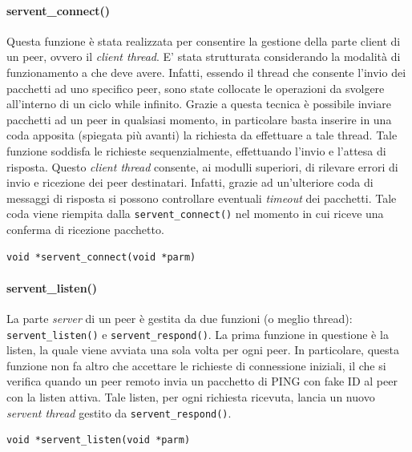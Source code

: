 \paragraph{servent\_connect()}
Questa funzione è stata realizzata per consentire la gestione della parte client di un peer, ovvero il \textit{client thread}. E' stata strutturata considerando la modalità di funzionamento a che deve avere. Infatti, essendo il thread che consente l'invio dei pacchetti ad uno specifico peer, sono state collocate le operazioni da svolgere all'interno di un ciclo while infinito. Grazie a questa tecnica è possibile inviare pacchetti ad un peer in qualsiasi momento, in particolare basta inserire in una coda apposita (spiegata più avanti) la richiesta da effettuare a tale thread. Tale funzione soddisfa le richieste sequenzialmente, effettuando l'invio e l'attesa di risposta.
Questo \textit{client thread} consente, ai modulli superiori, di rilevare errori di invio e ricezione dei peer destinatari. Infatti, grazie ad un'ulteriore coda di messaggi di risposta si possono controllare eventuali \textit{timeout} dei pacchetti. Tale coda viene riempita dalla \texttt{servent\_connect()} nel momento in cui riceve una conferma di ricezione pacchetto.
\begin{lstlisting}
void *servent_connect(void *parm)
\end{lstlisting}

\paragraph{servent\_listen()}
La parte \textit{server} di un peer è gestita da due funzioni (o meglio thread): \texttt{servent\_listen()} e \texttt{servent\_respond()}. La prima funzione in questione è la listen, la quale viene avviata una sola volta per ogni peer. In particolare, questa funzione non fa altro che accettare le richieste di connessione iniziali, il che si verifica quando un peer remoto invia un pacchetto di PING con fake ID al peer con la listen attiva. Tale listen, per ogni richiesta ricevuta, lancia un nuovo \textit{servent thread} gestito da \texttt{servent\_respond()}.
\begin{lstlisting}
void *servent_listen(void *parm)
\end{lstlisting}
